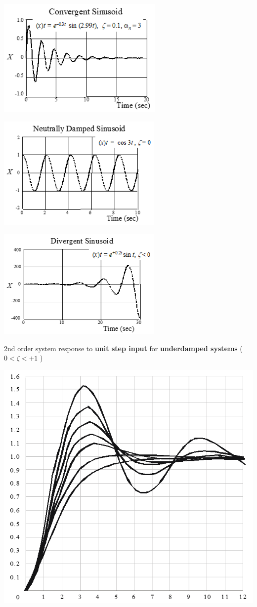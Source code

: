 \documentclass[
]{book}
\begin{document}
\includegraphics{media/08/image50.png}

\includegraphics{media/08/image51.png}

\includegraphics{media/08/image52.png}

2nd order system response to \textbf{unit step input} for \textbf{underdamped systems} ( \(0 \lt \zeta \lt +1\) )

\includegraphics{media/08/image53.png}
\end{document}
